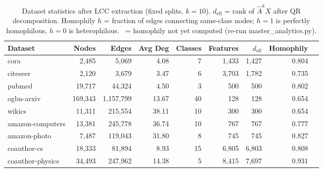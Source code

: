 \begin{table}[t]
\centering\small\setlength{\tabcolsep}{5pt}
\caption{Dataset statistics after LCC extraction (fixed splits, $k=10$). $d_{\mathrm{eff}}$ = rank of $\hat{A}^k X$ after QR decomposition. Homophily $h$ = fraction of edges connecting same-class nodes; $h{=}1$ is perfectly homophilous, $h{=}0$ is heterophilous. \textemdash\ = homophily not yet computed (re-run master\_analytics.py).}
\label{tab:dataset_statistics}
\begin{tabular}{lrrrrrrrr}
\toprule
Dataset & Nodes & Edges & Avg Deg & Classes & Features & $d_{\mathrm{eff}}$ & Homophily \\
\midrule
cora & 2,485 & 5,069 & 4.08 & 7 & 1,433 & 1,427 & 0.804 \\
citeseer & 2,120 & 3,679 & 3.47 & 6 & 3,703 & 1,782 & 0.735 \\
pubmed & 19,717 & 44,324 & 4.50 & 3 & 500 & 500 & 0.802 \\
ogbn\mbox{-}arxiv & 169,343 & 1,157,799 & 13.67 & 40 & 128 & 128 & 0.654 \\
wikics & 11,311 & 215,554 & 38.11 & 10 & 300 & 300 & 0.654 \\
amazon\mbox{-}computers & 13,381 & 245,778 & 36.74 & 10 & 767 & 767 & 0.777 \\
amazon\mbox{-}photo & 7,487 & 119,043 & 31.80 & 8 & 745 & 745 & 0.827 \\
coauthor\mbox{-}cs & 18,333 & 81,894 & 8.93 & 15 & 6,805 & 6,803 & 0.808 \\
coauthor\mbox{-}physics & 34,493 & 247,962 & 14.38 & 5 & 8,415 & 7,697 & 0.931 \\
\bottomrule\end{tabular}\end{table}